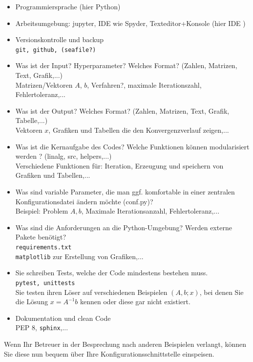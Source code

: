 \begin{itemize}
	\item Programmiersprache (hier Python)
	\item Arbeitsumgebung: jupyter, IDE wie Spyder, Texteditor+Konsole (hier IDE \pycharm)
	\item Versionskontrolle und backup\\
	{\beispiel \texttt{git, github, (seafile?)}}
	\item Was ist der Input? Hyperparameter? Welches Format? (Zahlen, Matrizen, Text, Grafik,...)\\
	{\beispiel Matrizen/Vektoren $A$, $b$, Verfahren?, maximale Iterationszahl, Fehlertoleranz,...}
	\item Was ist der Output? Welches Format? (Zahlen, Matrizen, Text, Grafik, Tabelle,...)
	\\
	{\beispiel Vektoren $x$, Grafiken und Tabellen die den Konvergenzverlauf zeigen,...}
	\item Was ist die Kernaufgabe des Codes? Welche Funktionen können modularisiert werden ? (linalg, src, helpers,...)\\
	{\beispiel Verschiedene Funktionen für: Iteration, Erzeugung und speichern von Grafiken und Tabellen,... }
	\item Was sind variable Parameter, die man ggf. komfortable in einer zentralen Konfigurationsdatei ändern möchte (conf.py)? \\
	{\beispiel Beispiel: Problem $A, b$, Maximale Iterationsanzahl, Fehlertoleranz,...}
	\item Was sind die Anforderungen an die Python-Umgebung? Werden externe Pakete benötigt?\\ \texttt{requirements.txt}\\
	{\beispiel \texttt{matplotlib} zur Erstellung von Grafiken,...}
	\item Sie schreiben Tests, welche der Code mindestens bestehen muss.\\ \texttt{pytest, unittests}\\
	{\beispiel Sie testen ihren Löser auf verschiedenen Beispielen $(A,b;x)$, bei denen Sie die Lösung $x =A^{-1}b$ kennen oder diese gar nicht existiert.}
	\item Dokumentation und clean Code\\
	{\beispiel PEP 8, \texttt{sphinx},...}
\end{itemize}
Wenn Ihr Betreuer in der Besprechung nach anderen Beispielen verlangt, können Sie diese nun bequem über Ihre Konfigurationsschnittstelle einspeisen.

